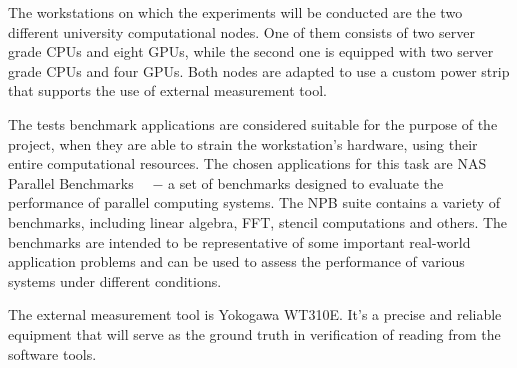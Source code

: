 The workstations on which the experiments will be conducted are
the two different university computational nodes. One of them
consists of two server grade CPUs and eight GPUs, while the second
one is equipped with two server grade CPUs and four GPUs. Both nodes
are adapted to use a custom power strip that supports the use
of external measurement tool.

The tests benchmark applications are considered suitable for the
purpose of the project, when they are able to strain the
workstation's hardware, using their entire computational resources.
The chosen applications for this task are NAS Parallel
Benchmarks~\cite{NPB}~\cite{NASA_Advanced_Supercomputing} $-$ a set
of benchmarks designed to evaluate the performance of parallel
computing systems. The NPB suite contains a variety of
benchmarks, including linear algebra, FFT, stencil computations
and others. The benchmarks are intended to be representative of
some important real-world application problems and can be used
to assess the performance of various systems under different
conditions.

The external measurement tool is Yokogawa WT310E. It's a precise
and reliable equipment that will serve as the ground truth in
verification of reading from the software tools.

